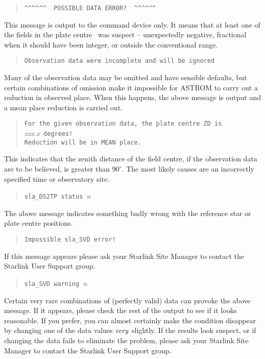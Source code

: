 \begin{quote}
\verb|^^^^^^  POSSIBLE DATA ERROR?  ^^^^^^|
\end{quote}
This message is output to the command device only.  It means that
at least one
of the fields in the plate centre \radec\ was suspect --
unexpectedly negative, fractional when it should have been
integer, or outside the conventional range.

\begin{quote}
\verb|Observation data were incomplete and will be ignored|
\end{quote}
Many of the observation data may be omitted and have sensible
defaults, but certain combinations of omission make it impossible
for ASTROM to carry out a reduction in observed place.  When this
happens, the above message is output and a mean place reduction
is carried out.

\begin{quote}
\verb|For the given observation data, the plate centre ZD is|
{\it xxx.x}\ \verb|degrees!|\\
\verb|Reduction will be in MEAN place.|
\end{quote}
This indicates that the
zenith distance of the field centre, if the observation data are to
be believed, is greater than $90^{\circ}$.  The most likely causes
are an incorrectly specified time or observatory site.

\begin{quote}
\verb|sla_DS2TP status |{\it n}
\end{quote}
The above message
indicates something badly wrong with the reference star or plate
centre positions.

\begin{quote}
\verb|Impossible sla_SVD error!|
\end{quote}
If this message appears please ask your Starlink Site Manager
to contact the Starlink User Support group.

\begin{quote}
\verb|sla_SVD warning |{\it n}
\end{quote}
Certain very rare combinations of (perfectly valid)
data can provoke the above message.
If it appears,
please check the rest of the output to see if it looks
reasonable.  If you
prefer, you can almost certainly make the condition disappear
by changing one of the data values {\it very}\, slightly.
If the results look suspect, or if changing the
data fails to eliminate the problem, please
ask your Starlink Site Manager
to contact the Starlink User Support group.

